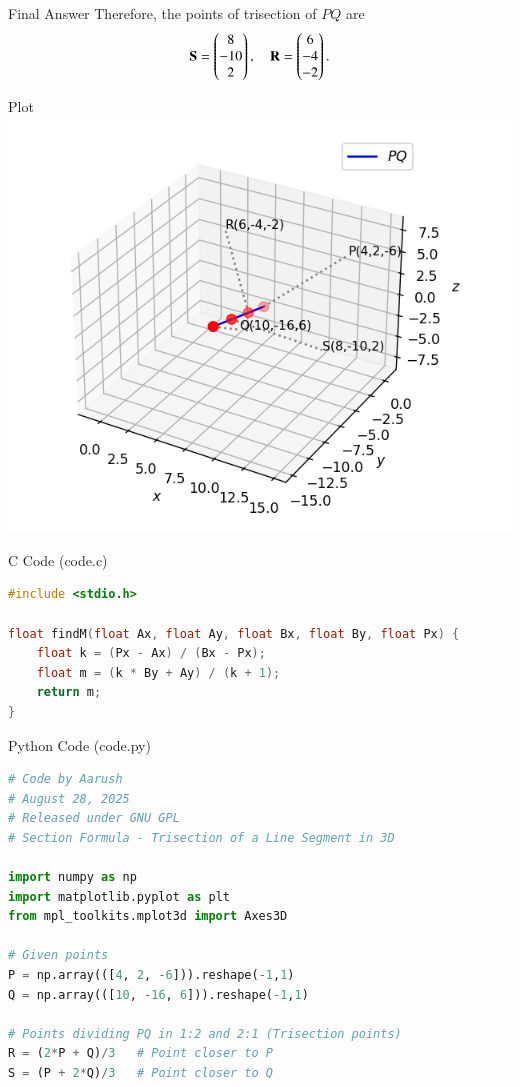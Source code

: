 \documentclass{beamer}
\begin{document}
\begin{frame}{Final Answer}
Therefore, the points of trisection of $PQ$ are
\[
\mathbf{S} = \begin{pmatrix}8\\-10\\2\end{pmatrix}, \quad \mathbf{R} = \begin{pmatrix}6\\-4\\-2\end{pmatrix}.
\]
\end{frame}

\begin{frame}{Plot}
\centering
\includegraphics[width=0.8\linewidth]{figs/fig.png}
\end{frame}


\begin{frame}[fragile]{C Code (code.c)}
\begin{lstlisting}[language=C]
#include <stdio.h>

float findM(float Ax, float Ay, float Bx, float By, float Px) {
    float k = (Px - Ax) / (Bx - Px);
    float m = (k * By + Ay) / (k + 1);
    return m;
}
\end{lstlisting}
\end{frame}
\begin{frame}[fragile]{Python Code (code.py)}
\begin{lstlisting}[language=Python]
# Code by Aarush
# August 28, 2025
# Released under GNU GPL
# Section Formula - Trisection of a Line Segment in 3D

import numpy as np
import matplotlib.pyplot as plt
from mpl_toolkits.mplot3d import Axes3D

# Given points
P = np.array(([4, 2, -6])).reshape(-1,1)
Q = np.array(([10, -16, 6])).reshape(-1,1)

# Points dividing PQ in 1:2 and 2:1 (Trisection points)
R = (2*P + Q)/3   # Point closer to P
S = (P + 2*Q)/3   # Point closer to Q
\end{lstlisting}
\end{frame}
\end{document}
